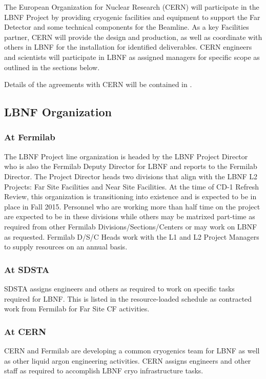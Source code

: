 The European Organization for Nuclear Research (CERN) will participate in the LBNF Project by providing cryogenic facilities and equipment to support the Far Detector and some technical components for the Beamline. As a key Facilities partner, CERN will provide the design and production, as well as coordinate with others in LBNF for the installation for identified deliverables. CERN engineers and scientists will participate in LBNF as assigned managers for specific scope as outlined in the sections below. 

Details of the agreements with CERN will be contained in  .  

\subsection{LBNF Organization}

\subsubsection{At Fermilab }
The LBNF Project line organization is headed by the LBNF Project Director who is also the Fermilab Deputy Director for LBNF and reports to the Fermilab Director. The Project Director heads two divisions that align with the LBNF L2 Projects: Far Site Facilities and Near Site Facilities. At the time of CD-1 Refresh Review, this organization is transitioning into existence and is expected to be in place in Fall 2015. Personnel who are working more than half time on the project are expected to be in these divisions while others may be matrixed part-time as required from other Fermilab Divisions/Sections/Centers or may work on LBNF as requested. Fermilab D/S/C Heads work with the L1 and L2 Project Managers to supply resources on an annual basis. 

\subsubsection{At SDSTA}
SDSTA assigns engineers and others as required to work on specific tasks required for LBNF. This is listed in the resource-loaded schedule as contracted work from Fermilab for Far Site CF activities. 

\subsubsection{At CERN}
CERN and Fermilab are developing a common cryogenics team for LBNF as well as other liquid argon engineering activities. CERN assigns engineers and other staff as required to accomplish LBNF cryo infrastructure tasks. 

